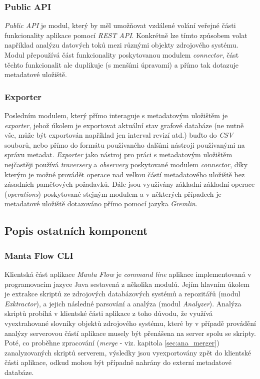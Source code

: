 \subsubsection{Public API}
\label{sec:ana_public}
\textit{Public API} je modul, který by měl umožňovat vzdálené volání veřejné části funkcionality aplikace pomocí \textit{REST API}. Konkrétně lze tímto způsobem volat například analýzu datových toků mezi různými objekty zdrojového systému. Modul přepoužívá část funkcionality poskytovanou modulem \textit{connector}, část těchto funkcionalit ale duplikuje (s menšími úpravami) a přímo tak dotazuje metadatové uložiště.

\subsubsection{Exporter}
\label{sec:ana_exporter}
Posledním modulem, který přímo interaguje s metadatovým uložištěm je \textit{exporter}, jehož úkolem je exportovat aktuální stav grafové databáze (ne nutně vše, může být exportován například jen interval revizí atd.) buďto do \textit{CSV} souborů, nebo přímo do formátu používaného dalšími nástroji používanými na správu metadat. \textit{Exporter} jako nástroj pro práci s metadatovým uložištěm nejčastěji používá \textit{traversery} a \textit{observery} poskytované modulem \textit{connector}, díky kterým je možné provádět operace nad velkou částí metadatového uložiště bez zásadních paměťových požadavků. Dále jsou využívány základní základní operace (\textit{operations}) poskytované stejným modulem a v některých případech je metadatové uložiště dotazováno přímo pomocí jazyka \textit{Gremlin}.


\subsection{Popis ostatních komponent}
\label{sec:ana_other}
\subsubsection{Manta Flow CLI}
Klientská část aplikace \textit{Manta Flow} je \textit{command line} aplikace implementovaná v programovacím jazyce Java sestavená z několika modulů. Jejím hlavním úkolem je extrakce skriptů ze zdrojových databázových systémů a repozitářů (modul \textit{Exktractor}), a jejich následné parsování a analýza (modul \textit{Analyzer}). Analýza skriptů probíhá v klientské části aplikace z toho důvodu, že využívá vyextrahované slovníky objektů zdrojového systému, které by v případě provádění analýzy serverovou částí aplikace musely být přenášena na server spolu se skripty. Poté, co proběhne zpracování (\textit{merge} - viz. kapitola \ref{sec:ana_merger}) zanalyzovaných skriptů serverem, výsledky jsou vyexportovány zpět do klientské části aplikace, odkud mohou být případně nahrány do externí metadatové databáze.

